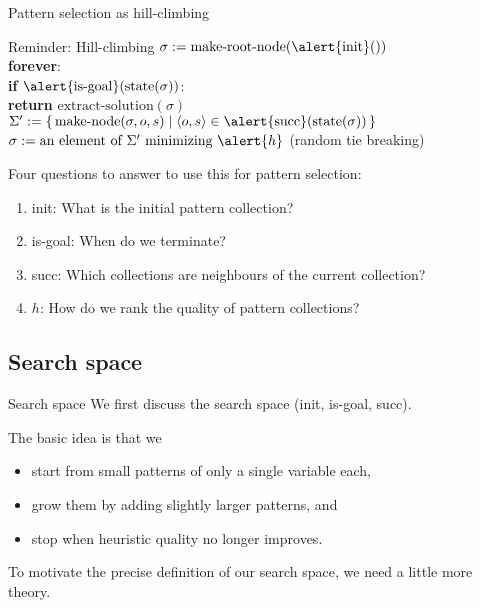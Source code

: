 \documentclass{gkibeamer}
\begin{document}
\begin{frame}{Pattern selection as hill-climbing}
  \begin{block}{Reminder: Hill-climbing}
    $\sigma := \text{make-root-node}(\alert{\text{init}}())$ \\
    \textbf{forever}: \\
    {}\qquad \textbf{if}
    $\alert{\text{is-goal}}(\text{state}(\sigma))$: \\
    {}\qquad\qquad \textbf{return} $\text{extract-solution}(\sigma)$
    \\
    {}\qquad $\Sigma' := \{\,\text{make-node}(\sigma, o, s) \mid
      \langle o, s\rangle \in
      \alert{\text{succ}}(\text{state}(\sigma))\,\}$ \\
    {}\qquad $\sigma := \text{an element of}~\Sigma'
    \text{~minimizing~} \alert{h}$ (random tie breaking)
  \end{block}

  Four questions to answer to use this for pattern selection:
  \begin{enumerate}
  \item \alert{init:} What is the initial pattern collection?
  \item \alert{is-goal:} When do we terminate?
  \item \alert{succ:} Which collections
    are neighbours of the current collection?
  \item \alert{$h$:} How do we rank the quality of pattern collections?
  \end{enumerate}
\end{frame}

\subsection{Search space}

\begin{frame}{Search space}
  We first discuss the \alert{search space} (init, is-goal, succ).

  \medskip

  The basic idea is that we
  \begin{itemize}
  \item start from \alert{small patterns} of only a single
    variable each,
  \item grow them by \alert{adding slightly larger patterns}, and
  \item stop when \alert{heuristic quality no longer improves}.
  \end{itemize}

  \medskip
  
  To motivate the precise definition of our search space, we need a
  little more theory.
\end{frame}
\end{document}
